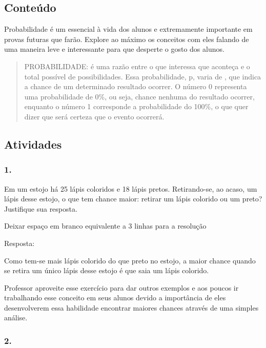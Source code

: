 \subsection{Conteúdo}\label{conteuxfado-6}

Probabilidade é um essencial à vida dos alunos e extremamente importante
em provas futuras que farão. Explore ao máximo os conceitos com eles
falando de uma maneira leve e interessante para que desperte o gosto dos
alunos.

\begin{quote}
PROBABILIDADE: é uma razão entre o que interessa que aconteça e o total
possível de possibilidades. Essa probabilidade, p, varia de , que indica
a chance de um determinado resultado ocorrer. O número 0 representa uma
probabilidade de 0\%, ou seja, chance nenhuma do resultado ocorrer,
enquanto o número 1 corresponde a probabilidade do 100\%, o que quer
dizer que será certeza que o evento ocorrerá.
\end{quote}

\subsection{Atividades}\label{atividades-6}

\subsubsection{1. }\label{section-95}

Em um estojo há 25 lápis coloridos e 18 lápis pretos. Retirando-se, ao
acaso, um lápis desse estojo, o que tem chance maior: retirar um lápis
colorido ou um preto? Justifique sua resposta.

Deixar espaço em branco equivalente a 3 linhas para a resolução

Resposta:

Como tem-se mais lápis colorido do que preto no estojo, a maior chance
quando se retira um único lápis desse estojo é que saia um lápis
colorido.

Professor aproveite esse exercício para dar outros exemplos e aos poucos
ir trabalhando esse conceito em seus alunos devido a importância de eles
desenvolverem essa habilidade encontrar maiores chances através de uma
simples análise.

\subsubsection{2.}\label{section-96}


